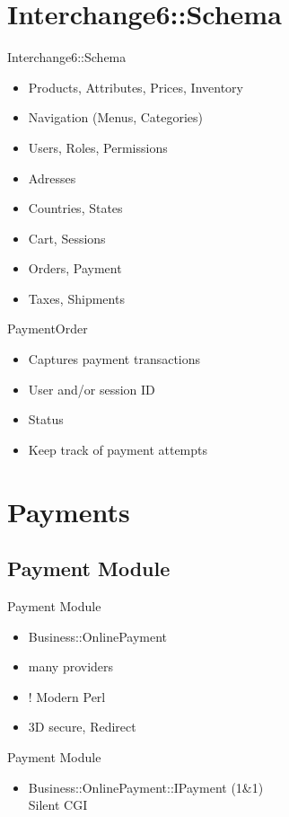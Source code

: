 \section{Interchange6::Schema}
\begin{frame}{Interchange6::Schema}
\begin{itemize}
 \item Products, Attributes, Prices, Inventory 
 \item Navigation (Menus, Categories)
 \item Users, Roles, Permissions 
 \item Adresses
 \item Countries, States
 \item Cart, Sessions
 \item Orders, Payment
 \item Taxes, Shipments
\end{itemize}
\end{frame}

\begin{frame}{PaymentOrder}
\begin{itemize}
 \item Captures payment transactions
 \item User and/or session ID
 \item Status
 \item Keep track of payment attempts
\end{itemize}
\end{frame}

\section{Payments}
\subsection{Payment Module}
\begin{frame}{Payment Module}
\begin{itemize}
\item Business::OnlinePayment
\item many providers
\item ! Modern Perl
\item 3D secure, Redirect
\end{itemize}
\end{frame}

\begin{frame}{Payment Module}
\begin{itemize}
\item Business::OnlinePayment::IPayment (1\&1) \\
Silent CGI
\end{itemize}
\end{frame}

